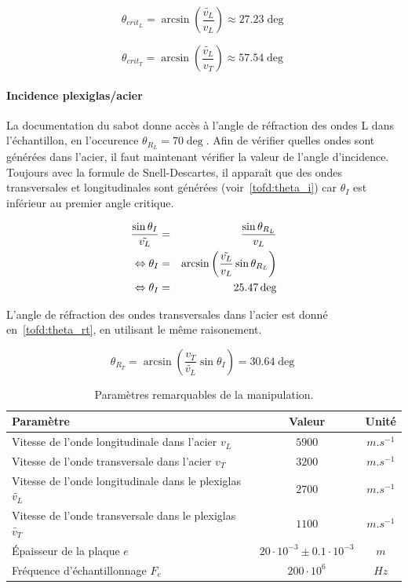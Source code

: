 \begin{equation}
    \theta_{crit_L} = \arcsin\left(\frac{\tilde{v_L}}{v_L}\right) \approx 27.23\deg
    \label{tofd:crit_L}
\end{equation}

\begin{equation}
    \theta_{crit_T} = \arcsin\left(\frac{\tilde{v_L}}{v_T}\right) \approx  57.54\deg
    \label{tofd:crit_T}
\end{equation}


\paragraph{Incidence plexiglas/acier} La documentation du sabot donne accès à l'angle de réfraction des ondes L dans l'échantillon, en l'occurence $\theta_{R_L} = 70\deg$. Afin de vérifier quelles ondes sont générées dans l'acier, il faut maintenant vérifier la valeur de l'angle d'incidence. Toujours avec la formule de Snell-Descartes, il apparaît que des ondes transversales et longitudinales sont générées (voir~\eqref{tofd:theta_i}) car $\theta_I$ est inférieur au premier angle critique.

\begin{eqnarray}
    \frac{\sin\theta_I}{\tilde{v_L}} & = &\frac{\sin\theta_{R_L}}{v_L}\notag\\
    \Leftrightarrow \theta_I & = & \arcsin\left(\frac{\tilde{v_L}}{v_L}\sin\theta_{R_L}\right)\notag\\
    \Leftrightarrow \theta_I & = & 25.47\deg \label{tofd:theta_i}
\end{eqnarray}

L'angle de réfraction des ondes transversales dans l'acier est donné en~\eqref{tofd:theta_rt}, en utilisant le même raisonement.

\begin{equation}
    \theta_{R_T} = \arcsin\left(\frac{v_T}{\tilde{v_L}}\sin\theta_I\right) = 30.64\deg
    \label{tofd:theta_rt}
\end{equation}

\begin{table}[h]
    \centering
    \begin{tabular}{l|cc}
        Paramètre & Valeur & Unité\\\hline
        Vitesse de l'onde longitudinale dans l'acier $v_L$ & $5900$ & $m.s^{-1}$\\
        Vitesse de l'onde transversale dans l'acier $v_T$ & $3200$ & $m.s^{-1}$\\
        Vitesse de l'onde longitudinale dans le plexiglas $\tilde{v_L}$ & $2700$ & $m.s^{-1}$\\
        Vitesse de l'onde transversale dans le plexiglas $\tilde{v_T}$ & $1100$ & $m.s^{-1}$\\
        Épaisseur de la plaque $e$ & $20\cdot 10^{-3} \pm 0.1\cdot 10^{-3}$ & $m$\\
        Fréquence d'échantillonnage $F_e$ & $200\cdot 10^{6}$ & $Hz$
    \end{tabular}
    \caption{Paramètres remarquables de la manipulation.}
    \label{table:params_tofd}
\end{table}

